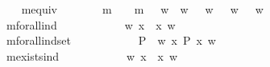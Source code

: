 \begin{isabellebody}
\ \ \isamarkupfalse%
\ mequiv\ {\isacharcolon}{\isacharcolon}\ {\isachardoublequoteopen}{\isasymsigma}\ {\isasymRightarrow}\ {\isasymsigma}\ {\isasymRightarrow}\ {\isasymsigma}{\isachardoublequoteclose}\ {\isacharparenleft}\ {\isachardoublequoteopen}m{\isasymequiv}{\isachardoublequoteclose}\ {}{}{\isacharparenright}\ \ {\isachardoublequoteopen}{\isasymphi}\ m{\isasymequiv}\ {\isasympsi}\ {\isasymequiv}\ {\isacharparenleft}{\isasymlambda}w{\isachardot}\ {\isacharparenleft}{\isasymphi}\ w\ {\isasymlongrightarrow}\ {\isasympsi}\ w{\isacharparenright}\ {\isasymand}\ {\isacharparenleft}{\isasympsi}\ w\ {\isasymlongrightarrow}\ {\isasymphi}\ w{\isacharparenright}{\isacharparenright}{\isachardoublequoteclose}\ \ \ \isanewline
\ \ \isamarkupfalse%
\ mforall{\isacharunderscore}ind\ {\isacharcolon}{\isacharcolon}\ {\isachardoublequoteopen}{\isacharparenleft}{\isasymmu}\ {\isasymRightarrow}\ {\isasymsigma}{\isacharparenright}\ {\isasymRightarrow}\ {\isasymsigma}{\isachardoublequoteclose}\ {\isacharparenleft}{\isachardoublequoteopen}{\isasymforall}{\isachardoublequoteclose}{\isacharparenright}\ \ {\isachardoublequoteopen}{\isasymforall}\ {\isasymPhi}\ {\isasymequiv}\ {\isacharparenleft}{\isasymlambda}w{\isachardot}\ {\isasymforall}x{\isachardot}\ {\isasymPhi}\ x\ w{\isacharparenright}{\isachardoublequoteclose}\ \ \ \isanewline
\ \ \isamarkupfalse%
\ mforall{\isacharunderscore}indset\ {\isacharcolon}{\isacharcolon}\ {\isachardoublequoteopen}{\isacharparenleft}{\isacharparenleft}{\isasymmu}\ {\isasymRightarrow}\ {\isasymsigma}{\isacharparenright}\ {\isasymRightarrow}\ {\isasymsigma}{\isacharparenright}\ {\isasymRightarrow}\ {\isasymsigma}{\isachardoublequoteclose}\ {\isacharparenleft}{\isachardoublequoteopen}{\isasymPi}{\isachardoublequoteclose}{\isacharparenright}\ \ {\isachardoublequoteopen}{\isasymPi}\ P\ {\isasymequiv}\ {\isacharparenleft}{\isasymlambda}w{\isachardot}\ {\isasymforall}x{\isachardot}\ P\ x\ w{\isacharparenright}{\isachardoublequoteclose}\isanewline
\ \ \isamarkupfalse%
\ mexists{\isacharunderscore}ind\ {\isacharcolon}{\isacharcolon}\ {\isachardoublequoteopen}{\isacharparenleft}{\isasymmu}\ {\isasymRightarrow}\ {\isasymsigma}{\isacharparenright}\ {\isasymRightarrow}\ {\isasymsigma}{\isachardoublequoteclose}\ {\isacharparenleft}{\isachardoublequoteopen}{\isasymexists}{\isachardoublequoteclose}{\isacharparenright}\ \ {\isachardoublequoteopen}{\isasymexists}\ {\isasymPhi}\ {\isasymequiv}\ {\isacharparenleft}{\isasymlambda}w{\isachardot}\ {\isasymexists}x{\isachardot}\ {\isasymPhi}\ x\ w{\isacharparenright}{\isachardoublequoteclose}\isanewline

\end{isabellebody}
